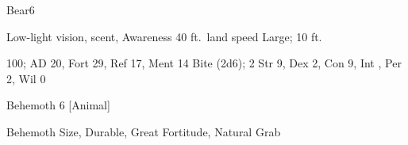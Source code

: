    \begin{monsection}[Brown]{Bear}{6}
        \begin{spellcontent}
            \begin{spelltargetinginfo}
                \pari {} Low-light vision, scent, Awareness 
                \pari {} 40 ft.\ land speed
                \pari {} Large;  10 ft.
            \end{spelltargetinginfo}
            \begin{spelleffects}
                \pari {} 100;  AD 20, Fort 29, Ref 17, Ment 14
                \pari {} Bite  (2d6);  2
                \pari {} Str 9, Dex 2, Con 9, Int , Per 2, Wil 0
            \end{spelleffects}
        \end{spellcontent}
        \begin{spellfooter}
            \pari {} Behemoth 6 [Animal]
            \pari {}
            \pari {}
        \end{spellfooter}
    \end{monsection}
     Behemoth Size, Durable, Great Fortitude, Natural Grab
